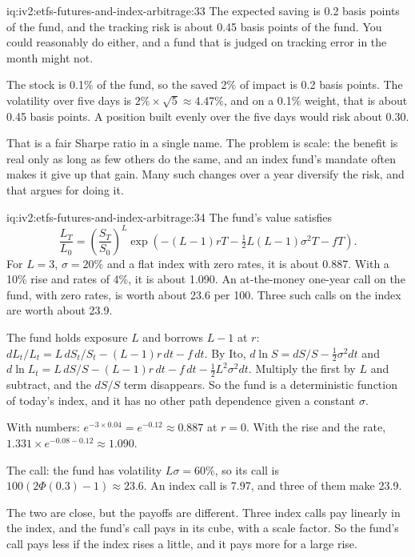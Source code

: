 \begin{solution}{iq:iv2:etfs-futures-and-index-arbitrage:33}
The expected saving is 0.2 basis points of the fund, and the tracking risk is about 0.45 basis points of the fund. You could reasonably do either, and a fund that is judged on tracking error in the month might not.

The stock is 0.1\% of the fund, so the saved 2\% of impact is 0.2 basis points. The volatility over five days is $2\% \times \sqrt 5 \approx 4.47\%$, and on a 0.1\% weight, that is about 0.45 basis points. A position built evenly over the five days would risk about 0.30.

That is a fair Sharpe ratio in a single name. The problem is scale: the benefit is real only as long as few others do the same, and an index fund's mandate often makes it give up that gain. Many such changes over a year diversify the risk, and that argues for doing it.

\end{solution}

\begin{solution}{iq:iv2:etfs-futures-and-index-arbitrage:34}
The fund's value satisfies
\[
\frac{L_T}{L_0} = \left(\frac{S_T}{S_0}\right)^{\!L}\exp\left(-(L - 1)rT - \tfrac12L(L - 1)\sigma^2T - fT\right).
\]
For $L = 3$, $\sigma = 20\%$ and a flat index with zero rates, it is about 0.887. With a 10\% rise and rates of 4\%, it is about 1.090. An at-the-money one-year call on the fund, with zero rates, is worth about 23.6 per 100. Three such calls on the index are worth about 23.9.

The fund holds exposure $L$ and borrows $L - 1$ at $r$: $dL_t/L_t = L\,dS_t/S_t - (L - 1)r\,dt - f\,dt$. By Ito, $d\ln S = dS/S - \tfrac12\sigma^2dt$ and $d\ln L_t = L\,dS/S - (L - 1)r\,dt - f\,dt - \tfrac12L^2\sigma^2dt$. Multiply the first by $L$ and subtract, and the $dS/S$ term disappears. So the fund is a deterministic function of today's index, and it has no other path dependence given a constant $\sigma$.

With numbers: $e^{-3 \times 0.04} = e^{-0.12} \approx 0.887$ at $r = 0$. With the rise and the rate, $1.331 \times e^{-0.08 - 0.12} \approx 1.090$.

The call: the fund has volatility $L\sigma = 60\%$, so its call is $100(2\Phi(0.3) - 1) \approx 23.6$. An index call is 7.97, and three of them make 23.9.

The two are close, but the payoffs are different. Three index calls pay linearly in the index, and the fund's call pays in its cube, with a scale factor. So the fund's call pays less if the index rises a little, and it pays more for a large rise.

\end{solution}

